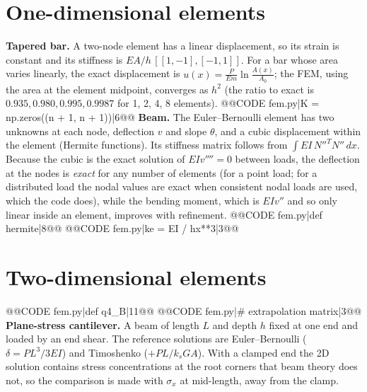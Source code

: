 {{{{{\section{One-dimensional elements}
\textbf{Tapered bar.} A two-node element has a linear displacement, so its strain is constant and its stiffness is $EA/h\,[[1,-1],[-1,1]]$. For a bar whose area varies linearly, the exact displacement is $u(x)=\frac{P}{Em}\ln\frac{A(x)}{A_0}$; the FEM, using the area at the element midpoint, converges as $h^2$ (the ratio to exact is $0.935,0.980,0.995,0.9987$ for 1, 2, 4, 8 elements).
@@CODE fem.py|K = np.zeros((n + 1, n + 1))|6@@
\textbf{Beam.} The Euler--Bernoulli element has two unknowns at each node, deflection $v$ and slope $\theta$, and a cubic displacement within the element (Hermite functions). Its stiffness matrix follows from $\int EI\,N''^TN''\,dx$. Because the cubic is the exact solution of $EIv''''=0$ between loads, the deflection at the nodes is \emph{exact} for any number of elements (for a point load; for a distributed load the nodal values are exact when consistent nodal loads are used, which the code does), while the bending moment, which is $EIv''$ and so only linear inside an element, improves with refinement.
@@CODE fem.py|def hermite|8@@
@@CODE fem.py|ke = EI / hx**3|3@@

\section{Two-dimensional elements}
@@CODE fem.py|def q4_B|11@@
@@CODE fem.py|# extrapolation matrix|3@@
\textbf{Plane-stress cantilever.} A beam of length $L$ and depth $h$ fixed at one end and loaded by an end shear. The reference solutions are Euler--Bernoulli ($\delta=PL^3/3EI$) and Timoshenko ($+PL/k_sGA$). With a clamped end the 2D solution contains stress concentrations at the root corners that beam theory does not, so the comparison is made with $\sigma_x$ at mid-length, away from the clamp.

}}}}}
